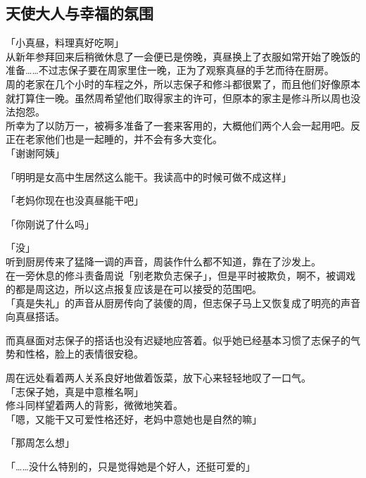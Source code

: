 \subsection{天使大人与幸福的氛围}

「小真昼，料理真好吃啊」\\

从新年参拜回来后稍微休息了一会便已是傍晚，真昼换上了衣服如常开始了晚饭的准备……不过志保子要在周家里住一晚，正为了观察真昼的手艺而待在厨房。\\

周的老家在几个小时的车程之外，所以志保子和修斗都很累了，而且他们好像原本就打算住一晚。虽然周希望他们取得家主的许可，但原本的家主是修斗所以周也没法抱怨。\\

所幸为了以防万一，被褥多准备了一套来客用的，大概他们两个人会一起用吧。反正在老家他们也是一起睡的，并不会有多大变化。\\

「谢谢阿姨」

「明明是女高中生居然这么能干。我读高中的时候可做不成这样」

「老妈你现在也没真昼能干吧」

「你刚说了什么吗」

「没」\\

听到厨房传来了猛降一调的声音，周装作什么都不知道，靠在了沙发上。\\

在一旁休息的修斗责备周说「别老欺负志保子」，但是平时被欺负，啊不，被调戏的都是周这边，所以这点报复应该是在可以接受的范围吧。\\

「真是失礼」的声音从厨房传向了装傻的周，但志保子马上又恢复成了明亮的声音向真昼搭话。

而真昼面对志保子的搭话也没有迟疑地应答着。似乎她已经基本习惯了志保子的气势和性格，脸上的表情很安稳。

周在远处看着两人关系良好地做着饭菜，放下心来轻轻地叹了一口气。\\

「志保子她，真是中意椎名啊」\\

修斗同样望着两人的背影，微微地笑着。\\

「嗯，又能干又可爱性格还好，老妈中意她也是自然的嘛」

「那周怎么想」

「……没什么特别的，只是觉得她是个好人，还挺可爱的」

